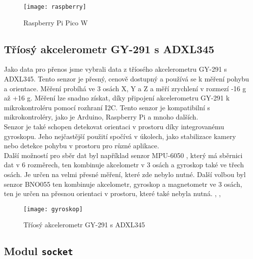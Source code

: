 \documentclass[12pt]{report}			%
\begin{document}
\begin{figure}[h]
\caption{Raspberry Pi Pico W}
\centering
\texttt{[image: raspberry]}
\end{figure}

\subsection{Tříosý akcelerometr GY-291 s ADXL345}

Jako data pro přenos jsme vybrali data z
tříosého akcelerometru GY-291 s ADXL345. Tento senzor je přesný, cenově dostupný a používá se k měření pohybu a orientace. Měření probíhá ve 3 osách X, Y a Z a měří zrychlení v rozmezí -16 g až +16 g. Měření lze snadno získat, díky připojení akcelerometru GY-291 k mikrokontroléru pomocí rozhraní I2C. Tento senzor je kompatibilní s mikrokontroléry, jako je Arduino, Raspberry Pi a mnoho dalších.
\\
Senzor je také schopen detekovat orientaci v prostoru díky integrovanému gyroskopu. Jeho nejčastější použití spočívá v úkolech, jako stabilizace kamery nebo detekce pohybu v prostoru pro různé aplikace.
\\
Další možností pro sběr dat byl například senzor MPU-6050
, který má sběrnici dat v 6 rozměrech, ten kombinuje akcelometr v 3 osách a gyroskop také ve třech osách. Je určen na velmi přesné měření, které zde nebylo nutné. Další volbou byl senzor BNO055
 ten kombinuje akcelometr, gyroskop a magnetometr ve 3 osách, ten je určen na přesnou orientaci v prostoru, které také nebyla nutná. \cite{gyroskop}, \cite{MPU}, \cite{BNO}

\begin{figure}[h]
\caption{Tříosý akcelerometr GY-291 s ADXL345}
\centering
\texttt{[image: gyroskop]}
\end{figure}

\subsection{Modul \texttt{socket}}
\end{document}
